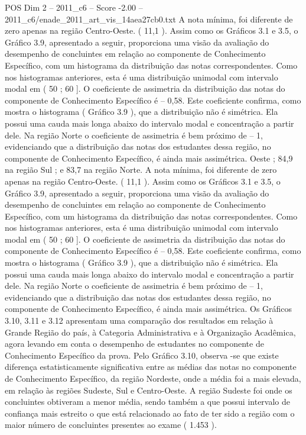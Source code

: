 \begin{textsample}{POS Dim 2 – 2011\_c6 – Score -2.00 – 2011\_c6/enade\_2011\_art\_vis\_14aea27cb0.txt}
A nota mínima, foi diferente de zero apenas na região Centro-Oeste. ( 11,1 ).
Assim como os Gráficos 3.1 e 3.5, o Gráfico 3.9, apresentado a seguir, proporciona uma visão da avaliação do desempenho de concluintes em relação ao componente de Conhecimento Específico, com um histograma da distribuição das notas correspondentes.
Como nos histogramas anteriores, esta é uma distribuição unimodal com intervalo modal em ( 50 ; 60 ].
O coeficiente de assimetria da distribuição das notas do componente de Conhecimento Específico é – 0,58.
Este coeficiente confirma, como mostra o histograma ( Gráfico 3.9 ), que a distribuição não é simétrica.
Ela possui uma cauda mais longa abaixo do intervalo modal e concentração a partir dele.
Na região Norte o coeficiente de assimetria é bem próximo de – 1, evidenciando que a distribuição das notas dos estudantes dessa região, no componente de Conhecimento Específico, é ainda mais assimétrica.
Oeste ; 84,9 na região Sul ; e 83,7 na região Norte.
A nota mínima, foi diferente de zero apenas na região Centro-Oeste. ( 11,1 ).
Assim como os Gráficos 3.1 e 3.5, o Gráfico 3.9, apresentado a seguir, proporciona uma visão da avaliação do desempenho de concluintes em relação ao componente de Conhecimento Específico, com um histograma da distribuição das notas correspondentes.
Como nos histogramas anteriores, esta é uma distribuição unimodal com intervalo modal em ( 50 ; 60 ].
O coeficiente de assimetria da distribuição das notas do componente de Conhecimento Específico é – 0,58.
Este coeficiente confirma, como mostra o histograma ( Gráfico 3.9 ), que a distribuição não é simétrica.
Ela possui uma cauda mais longa abaixo do intervalo modal e concentração a partir dele.
Na região Norte o coeficiente de assimetria é bem próximo de – 1, evidenciando que a distribuição das notas dos estudantes dessa região, no componente de Conhecimento Específico, é ainda mais assimétrica.
Os Gráficos 3.10, 3.11 e 3.12 apresentam uma comparação dos resultados em relação à Grande Região do país, à Categoria Administrativa e à Organização Acadêmica, agora levando em conta o desempenho de estudantes no componente de Conhecimento Específico da prova.
Pelo Gráfico 3.10, observa -se que existe diferença estatisticamente significativa entre as médias das notas no componente de Conhecimento Específico, da região Nordeste, onde a média foi a mais elevada, em relação às regiões Sudeste, Sul e Centro-Oeste.
A região Sudeste foi onde os concluintes obtiveram a menor média, sendo também a que possui intervalo de confiança mais estreito o que está relacionado ao fato de ter sido a região com o maior número de concluintes presentes ao exame ( 1.453 ).

\end{textsample}
